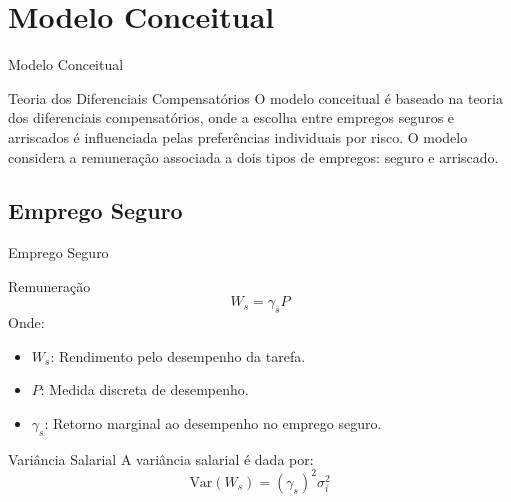 \documentclass[aspectratio=169, xcolor={dvipsnames}, 10pt, brazil]{beamer}
\begin{document}
\section{Modelo Conceitual}

\begin{frame}{Modelo Conceitual}

    \begin{block}{Teoria dos Diferenciais Compensatórios}
        O modelo conceitual é baseado na teoria dos diferenciais compensatórios, onde a escolha entre empregos seguros e arriscados é influenciada pelas preferências individuais por risco. O modelo considera a remuneração associada a dois tipos de empregos: seguro e arriscado.
    \end{block}

\end{frame}

\subsection{Emprego Seguro}
\begin{frame}{Emprego Seguro}

    \begin{block}{Remuneração}
        \[
        W_s = \gamma_s P
        \]
        Onde:
        \begin{itemize}
            \item \( W_s \): Rendimento pelo desempenho da tarefa.
            \item \( P \): Medida discreta de desempenho.
            \item \( \gamma_s \): Retorno marginal ao desempenho no emprego seguro.
        \end{itemize}
    \end{block}

    \begin{block}{Variância Salarial}
        A variância salarial é dada por:
        \[
        \text{Var}(W_s) = (\gamma_s)^2 \sigma_i^2
        \]
    \end{block}

\end{frame}

\end{document}
